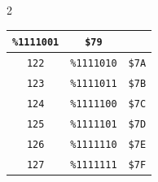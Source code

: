 \begin{multicols}{2}
\begin{center}
\begin{tabular}{|c|c|c|}
\texttt{\%1111001} &  \texttt{\$79} \\ \hline \texttt{122} & \texttt{\%1111010} &  \texttt{\$7A} \\ \hline \texttt{123} & \texttt{\%1111011} &  \texttt{\$7B} \\ \hline \texttt{124} & \texttt{\%1111100} &  \texttt{\$7C} \\ \hline \texttt{125} & \texttt{\%1111101} &  \texttt{\$7D} \\ \hline \texttt{126} & \texttt{\%1111110} &  \texttt{\$7E} \\ \hline \texttt{127} & \texttt{\%1111111} &  \texttt{\$7F} \\ \hline
		\end{tabular}
	\end{center}
\end{multicols}

\vspace*{\fill}

\clearpage

\vspace*{\fill}

